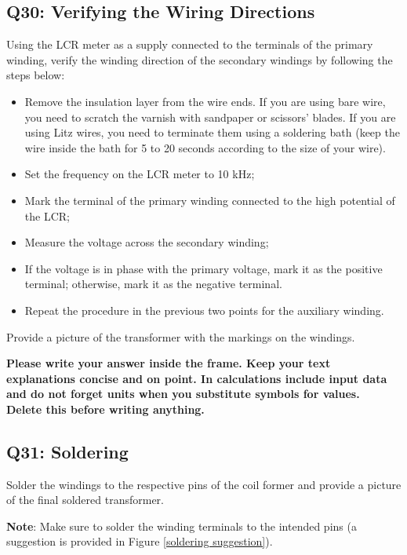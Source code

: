 \documentclass{PELsmallreport}
\begin{document}
\subsection{Q30: Verifying the Wiring Directions} 
Using the LCR meter as a supply connected to the terminals of the primary winding, verify the winding direction of the secondary windings by following the steps below:
\begin{itemize}
    \item Remove the insulation layer from the wire ends. 
    If you are using bare wire, you need to scratch the varnish with sandpaper or scissors' blades. 
    If you are using Litz wires, you need to terminate them using a soldering bath (keep the wire inside the bath for 5 to 20 seconds according to the size of your wire).
    \item Set the frequency on the LCR meter to 10 kHz;
    \item Mark the terminal of the primary winding connected to the high potential of the LCR;
    \item Measure the voltage across the secondary winding;
    \item If the voltage is in phase with the primary voltage, mark it as the positive terminal; otherwise, mark it as the negative terminal.
    \item Repeat the procedure in the previous two points for the auxiliary winding.
\end{itemize}
Provide a picture of the transformer with the markings on the windings. 
\begin{framed}
	\vspace{2em}
	\textbf{Please write your answer inside the frame. Keep your text explanations concise and on point. In calculations include input data and do not forget units when you substitute symbols for values. \\ Delete this before writing anything.}
	\vspace{2em}
\end{framed}
\hfill{}






\subsection{Q31: Soldering} 
Solder the windings to the respective pins of the coil former and provide a picture of the final soldered transformer. 

\textbf{Note}: Make sure to solder the winding terminals to the intended pins (a suggestion is provided in Figure \ref{soldering suggestion}).
\end{document}
